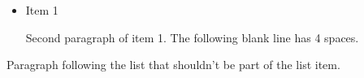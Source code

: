 
\begin{itemize}
\item Item 1

Second paragraph of item 1.
The following blank line has 4 spaces.

\end{itemize}

Paragraph following the list that shouldn't be part of the list item.
